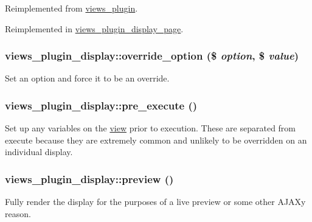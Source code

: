 Reimplemented from \hyperlink{classviews__plugin_a46d72eb35feea36fed83cd1355a47431}{views\_\-plugin}.

Reimplemented in \hyperlink{classviews__plugin__display__page_a192c8feb8740fdb389600fb7a8588c27}{views\_\-plugin\_\-display\_\-page}.\hypertarget{classviews__plugin__display_a1f5eb1e77d0e8754f0ae0e8092cc2190}{
\subsubsection[{override\_\-option}]{\setlength{\rightskip}{0pt plus 5cm}views\_\-plugin\_\-display::override\_\-option (\$ {\em option}, \/  \$ {\em value})}}
\label{classviews__plugin__display_a1f5eb1e77d0e8754f0ae0e8092cc2190}
Set an option and force it to be an override. \hypertarget{classviews__plugin__display_a04a01e109a38effdfbf77f78ecfd67ad}{
\subsubsection[{pre\_\-execute}]{\setlength{\rightskip}{0pt plus 5cm}views\_\-plugin\_\-display::pre\_\-execute ()}}
\label{classviews__plugin__display_a04a01e109a38effdfbf77f78ecfd67ad}
Set up any variables on the \hyperlink{classview}{view} prior to execution. These are separated from execute because they are extremely common and unlikely to be overridden on an individual display. \hypertarget{classviews__plugin__display_a39a392ae163b9d5850559e3cf098e64f}{
\subsubsection[{preview}]{\setlength{\rightskip}{0pt plus 5cm}views\_\-plugin\_\-display::preview ()}}
\label{classviews__plugin__display_a39a392ae163b9d5850559e3cf098e64f}
Fully render the display for the purposes of a live preview or some other AJAXy reason. 

